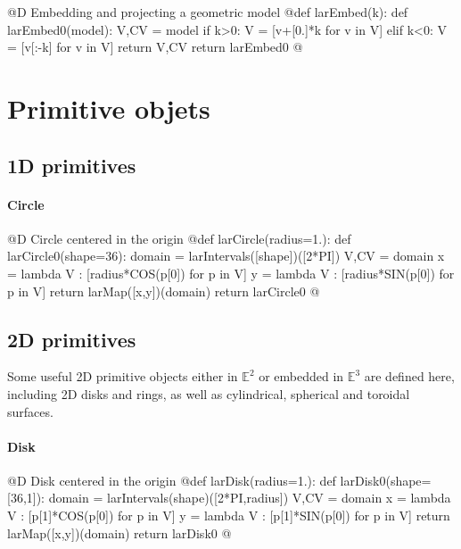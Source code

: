 \documentclass[11pt,oneside]{article}	%
\def\E{\mathbb{E}}
\begin{document}
@D Embedding and projecting a geometric model
@{def larEmbed(k):
	def larEmbed0(model):
		V,CV = model
		if k>0:
			V = [v+[0.]*k for v in V] 
		elif k<0:
			V = [v[:-k] for v in V] 
		return V,CV
	return larEmbed0
@}


\section{Primitive objets}
\subsection{1D primitives}

\paragraph{Circle}
@D Circle centered in the origin
@{def larCircle(radius=1.):
	def larCircle0(shape=36):
		domain = larIntervals([shape])([2*PI])
		V,CV = domain
		x = lambda V : [radius*COS(p[0]) for p in V]
		y = lambda V : [radius*SIN(p[0]) for p in V]
		return larMap([x,y])(domain)
	return larCircle0
@}
\subsection{2D primitives}
Some useful 2D primitive objects either in $\E^2$ or embedded in $\E^3$ are defined here, including 2D disks and rings, as well as cylindrical, spherical and toroidal surfaces.

\paragraph{Disk}
@D Disk centered in the origin
@{def larDisk(radius=1.):
	def larDisk0(shape=[36,1]):
		domain = larIntervals(shape)([2*PI,radius])
		V,CV = domain
		x = lambda V : [p[1]*COS(p[0]) for p in V]
		y = lambda V : [p[1]*SIN(p[0]) for p in V]
		return larMap([x,y])(domain)
	return larDisk0
@}
\end{document}

